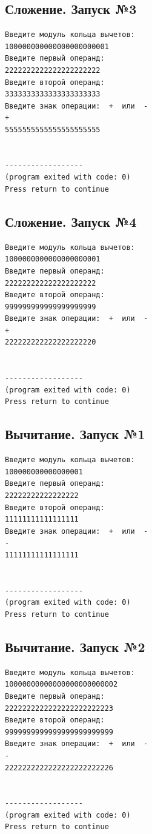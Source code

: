 \documentclass[a4paper,12pt]{article} %
\begin{document}
\subsection*{Сложение. Запуск №3}
\begin{verbatim}
Введите модуль кольца вычетов:
100000000000000000000001
Введите первый операнд:
2222222222222222222222
Введите второй операнд:
3333333333333333333333
Введите знак операции:  +  или  -
+
5555555555555555555555


------------------
(program exited with code: 0)
Press return to continue
\end{verbatim}

\subsection*{Сложение. Запуск №4}
\begin{verbatim}
Введите модуль кольца вычетов:
1000000000000000000001
Введите первый операнд:
222222222222222222222
Введите второй операнд:
999999999999999999999
Введите знак операции:  +  или  -
+
222222222222222222220


------------------
(program exited with code: 0)
Press return to continue
\end{verbatim}


\subsection*{Вычитание. Запуск №1}
\begin{verbatim}
Введите модуль кольца вычетов:
100000000000000001
Введите первый операнд:
22222222222222222
Введите второй операнд:
11111111111111111
Введите знак операции:  +  или  -
-
11111111111111111


------------------
(program exited with code: 0)
Press return to continue
\end{verbatim}

\subsection*{Вычитание. Запуск №2}
\begin{verbatim}
Введите модуль кольца вычетов:
10000000000000000000000002
Введите первый операнд:
2222222222222222222222223
Введите второй операнд:
9999999999999999999999999
Введите знак операции:  +  или  -
-
2222222222222222222222226


------------------
(program exited with code: 0)
Press return to continue
\end{verbatim}
\end{document}

